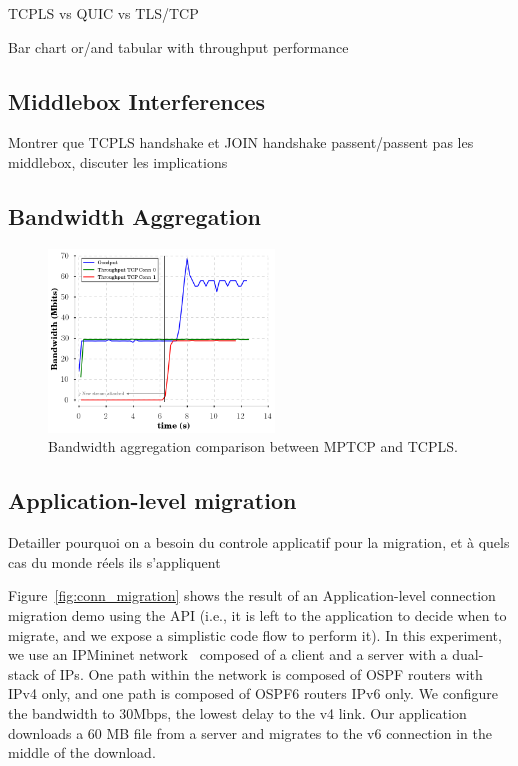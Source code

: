 TCPLS vs QUIC vs TLS/TCP

Bar chart or/and tabular with throughput performance

\subsection{Middlebox Interferences}

Montrer que TCPLS handshake et JOIN handshake passent/passent pas les middlebox,
discuter les implications

\subsection{Bandwidth Aggregation}

\begin{figure}[!t]
  \begin{center}
    \includegraphics[width=6cm]{figures/multipath_aggregate.png}
  \end{center}
  \caption{Bandwidth aggregation comparison between MPTCP and TCPLS.}
\end{figure}

\subsection{Application-level migration}

Detailler pourquoi on a besoin du controle applicatif pour la migration, et à
quels cas du monde réels ils s'appliquent


Figure~\ref{fig:conn_migration} shows the result of an Application-level
connection migration demo using the API (i.e., it is left to the
application to decide when to migrate, and we expose a simplistic code flow to
perform it). In this experiment, we use an IPMininet network~\cite{ipmininet, jadin2020educational}
composed of a client and a server with a dual-stack of IPs. One path within the
network is composed of OSPF routers with IPv4 only, and one path is composed of
OSPF6 routers IPv6 only. We configure the bandwidth to 30Mbps, the lowest delay
to the v4 link. Our application
downloads a 60 MB file from a server and migrates to the v6 connection in
the middle of the download.

